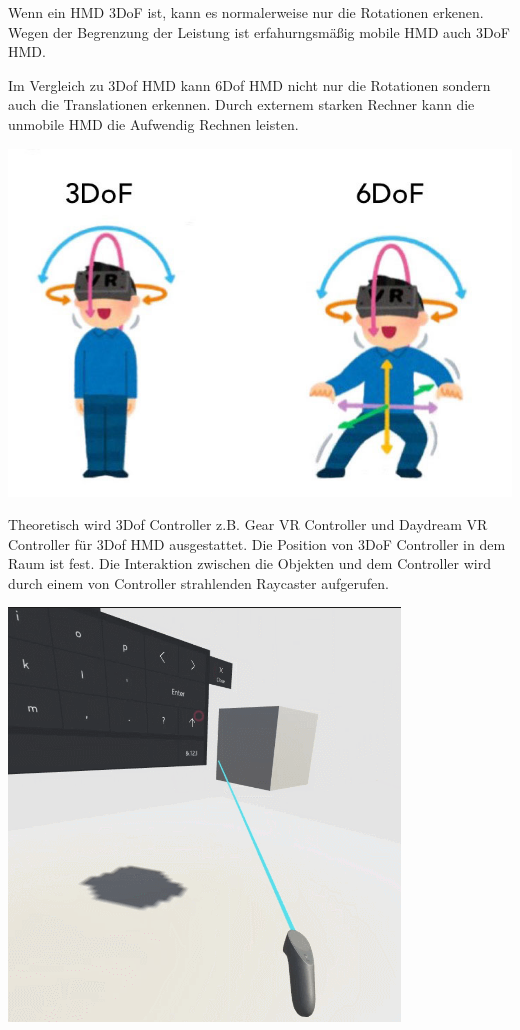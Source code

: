  Wenn ein HMD 3DoF ist, kann es normalerweise nur die Rotationen erkenen. Wegen der Begrenzung der Leistung ist erfahurngsmäßig mobile HMD auch 3DoF HMD.
  
  Im Vergleich zu 3Dof HMD kann 6Dof HMD nicht nur die Rotationen sondern auch die Translationen erkennen. Durch externem starken Rechner kann die unmobile HMD die Aufwendig Rechnen leisten.
  
   \includegraphics[width=\textwidth]{images/6DoF-vs-3DoF.jpg}
  
  Theoretisch wird 3Dof Controller z.B. Gear VR Controller und Daydream VR Controller für 3Dof HMD ausgestattet. Die Position von 3DoF Controller in dem Raum ist fest. Die Interaktion zwischen die Objekten und dem Controller wird durch einem von Controller strahlenden Raycaster aufgerufen.

\includegraphics[width=\textwidth]{images/3dcontroller.png}
  
